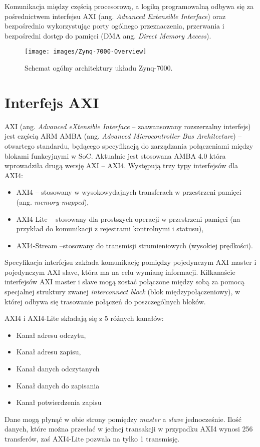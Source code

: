 Komunikacja między częścią procesorową, a logiką programowalną odbywa się za pośrednictwem interfejsu AXI (ang. \textit{Advanced Extensible Interface}) oraz bezpośrednio wykorzystując porty ogólnego przeznaczenia, przerwania i bezpośredni dostęp do pamięci (DMA ang. \textit{Direct Memory Access}).

\begin{figure}[h]
    \centering
    \texttt{[image: images/Zynq-7000-Overview]}
    \caption{Schemat ogólny architektury układu Zynq-7000.}
    \label{fig:zynq7000}
\end{figure}

\section{Interfejs AXI}
 AXI (ang. \textit{Advanced eXtensible Interface} --  zaawansowany rozszerzalny interfejs) jest częścią ARM AMBA (ang.\textit{ Advanced Microcontroller Bus Architecture}) -- otwartego standardu, będącego specyfikacją do zarządzania połączeniami między blokami funkcyjnymi w SoC. 
 Aktualnie jest stosowana AMBA 4.0 która wprowadziła drugą wersję AXI -- AXI4. 
 Występują trzy typy interfejsów dla AXI4:
\begin{itemize}
\item AXI4 -- stosowany w wysokowydajnych transferach w przestrzeni pamięci (ang. \textit{memory-mapped}),
\item AXI4-Lite -- stosowany dla prostszych operacji w przestrzeni pamięci (na przykład do komunikacji z rejestrami kontrolnymi i statusu),
\item AXI4-Stream --stosowany do transmisji strumieniowych (wysokiej prędkości). 
\end{itemize}
Specyfikacja interfejsu zakłada komunikację pomiędzy pojedynczym AXI master i pojedynczym AXI slave, która ma na celu wymianę informacji. 
Kilkanaście interfejsów AXI master i slave mogą zostać połączone między sobą za pomocą specjalnej struktury zwanej \textit{interconnect block} (blok międzypołączeniowy), w której odbywa się trasowanie połączeń do poszczególnych bloków. 

AXI4 i AXI4-Lite składają się z 5 różnych kanałów:
\begin{itemize}
\item Kanał adresu odczytu,
\item Kanał adresu zapisu,
\item Kanał danych odczytanych
\item Kanał danych do zapisania
\item Kanał potwierdzenia zapisu
\end{itemize}
Dane mogą płynąć w obie strony pomiędzy \textit{master} a \textit{slave} jednocześnie.
Ilość danych, które można przesłać w jednej transakcji w przypadku AXI4 wynosi 256 transferów, zaś AXI4-Lite pozwala na tylko 1 transmisję.

